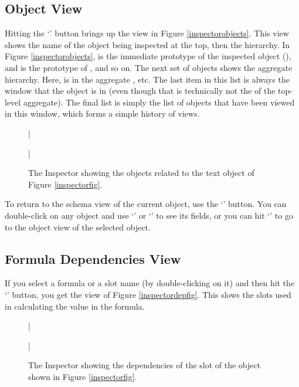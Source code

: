 \subsection{Object View}
\label{inspectobjects}
Hitting the `' button brings up the view in Figure
\ref{inspectorobjects}.  This view shows the name of the object being
inspected at the top, then the  hierarchy.  In Figure
\ref{inspectorobjects},  is the immediate prototype of
the inspected object (), and  is the
prototype of , and so on.  The next set of objects shows
the aggregate hierarchy.  Here,  is in the aggregate
, etc.  The last item in this list is
always the window that the object is in (even though that is
technically not the  of the top-level aggregate).  The
final list is simply the list of objects that have been viewed in this
window, which forms a simple history of views.

\begin{figure}
\bar{}
\begin{center}
\end{center}
\caption{The Inspector showing the objects related to the text object
of Figure \ref{inspectorfig}.}
\bar{}
\end{figure}

To return to the schema view of the current object, use the
`' button.  You can double-click on any object and use
`' or `' to see its fields, or you can hit
`' to go to the object view of the selected object.

\subsection{Formula Dependencies View}
\label{dependencysec}
If you select a formula or a slot name (by double-clicking on it) and
then hit the `' button, you get the view of Figure
\ref{inspectordepfig}.  This slows the slots used in calculating the
value in the formula.

\begin{figure}
\bar{}
\begin{center}
\end{center}
\caption{The Inspector showing the dependencies of the 
slot of the object shown in Figure \ref{inspectorfig}.}
\bar{}
\end{figure}

